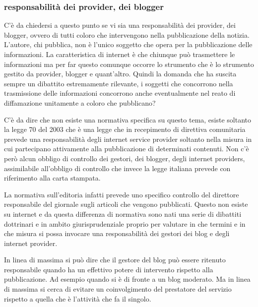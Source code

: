 \subsubsection{responsabilità dei provider, dei blogger}
C'è da chiedersi a questo punto se vi sia una responsabilità dei provider, dei blogger, ovvero di tutti coloro che intervengono nella pubblicazione della notizia. L'autore, chi pubblica, non è l'unico soggetto che opera per la pubblicazione delle informazioni. La caratteristica di internet è che chiunque può trasmettere le informazioni ma per far questo comunque occorre lo strumento che è lo strumento gestito da provider, blogger e quant'altro. Quindi la domanda che ha suscita sempre un dibattito estremamente rilevante, i soggetti che concorrono nella trasmissione delle informazioni concorrono anche eventualmente nel reato di diffamazione unitamente a coloro che pubblicano?\par
C'è da dire che non esiste una normativa specifica su questo tema, esiste soltanto la legge 70 del 2003 che è una legge che in recepimento di direttiva comunitaria prevede una responsabilità degli internet service provider soltanto nella misura in cui partecipano attivamente alla pubblicazione di determinati contenuti. Non c'è però alcun obbligo di controllo dei gestori, dei blogger, degli internet providers, assimilabile all'obbligo di controllo che invece la legge italiana prevede con riferimento alla carta stampata.\par
La normativa sull'editoria infatti prevede uno specifico controllo del direttore responsabile del giornale sugli articoli che vengono pubblicati. Questo non esiste su internet e da questa differenza di normativa sono nati una serie di dibattiti dottrinari e in ambito giurisprudenziale proprio per valutare in che termini e in che misura si possa invocare una responsabilità dei gestori dei blog e degli internet provider.\par
In linea di massima si può dire che il gestore del blog può essere ritenuto responsabile quando ha un effettivo potere di intervento rispetto alla pubblicazione. Ad esempio quando si è di fronte a un blog moderato. Ma in linea di massima si cerca di evitare un coinvolgimento del prestatore del servizio rispetto a quella che è l'attività che fa il singolo.\par
